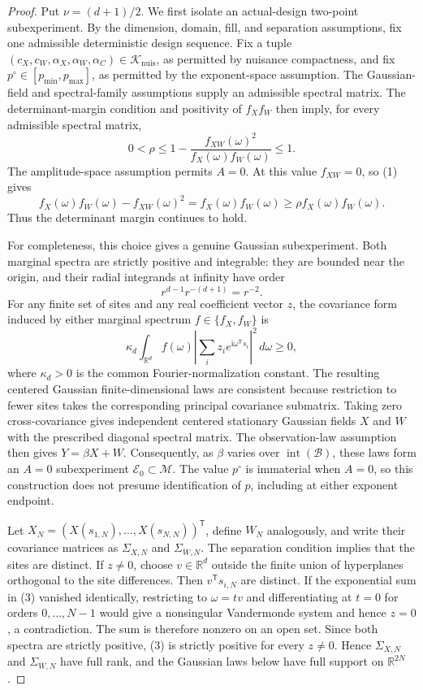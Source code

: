 \documentclass{article}
\begin{document}
\begin{proof}
Put \(\nu=(d+1)/2\).  We first isolate an actual-design two-point subexperiment.  By the dimension, domain, fill, and separation assumptions, fix one admissible deterministic design sequence.  Fix a tuple \((c_X,c_W,\alpha_X,\alpha_W,\alpha_C)\in\mathcal K_{\mathrm{nuis}}\), as permitted by nuisance compactness, and fix \(p^\circ\in[p_{\min},p_{\max}]\), as permitted by the exponent-space assumption.  The Gaussian-field and spectral-family assumptions supply an admissible spectral matrix.  The determinant-margin condition and positivity of \(f_Xf_W\) then imply, for every admissible spectral matrix,
\[
 0<\rho\leq 1-\frac{f_{XW}(\omega)^2}{f_X(\omega)f_W(\omega)}\leq1.
 \tag{1}
\]
The amplitude-space assumption permits \(A=0\).  At this value \(f_{XW}=0\), so (1) gives
\[
 f_X(\omega)f_W(\omega)-f_{XW}(\omega)^2
 =f_X(\omega)f_W(\omega)
 \geq\rho f_X(\omega)f_W(\omega).
 \tag{2}
\]
Thus the determinant margin continues to hold.

For completeness, this choice gives a genuine Gaussian subexperiment.  Both marginal spectra are strictly positive and integrable: they are bounded near the origin, and their radial integrands at infinity have order
\[
 r^{d-1}r^{-(d+1)}=r^{-2}.
\]
For any finite set of sites and any real coefficient vector \(z\), the covariance form induced by either marginal spectrum \(f\in\{f_X,f_W\}\) is
\[
 \kappa_d\int_{\mathbb R^d}f(\omega)
 \left|\sum_i z_i e^{\mathrm i\omega^{\mathsf T}s_i}\right|^2\,d\omega\geq0,
 \tag{3}
\]
where \(\kappa_d>0\) is the common Fourier-normalization constant.  The resulting centered Gaussian finite-dimensional laws are consistent because restriction to fewer sites takes the corresponding principal covariance submatrix.  Taking zero cross-covariance gives independent centered stationary Gaussian fields \(X\) and \(W\) with the prescribed diagonal spectral matrix.  The observation-law assumption then gives \(Y=\beta X+W\).  Consequently, as \(\beta\) varies over \(\operatorname{int}(\mathcal B)\), these laws form an \(A=0\) subexperiment \(\mathcal E_0\subset\mathcal M\).  The value \(p^\circ\) is immaterial when \(A=0\), so this construction does not presume identification of \(p\), including at either exponent endpoint.

Let \(X_N=(X(s_{1,N}),\ldots,X(s_{N,N}))^{\mathsf T}\), define \(W_N\) analogously, and write their covariance matrices as \(\Sigma_{X,N}\) and \(\Sigma_{W,N}\).  The separation condition implies that the sites are distinct.  If \(z\ne0\), choose \(v\in\mathbb R^d\) outside the finite union of hyperplanes orthogonal to the site differences.  Then \(v^{\mathsf T}s_{i,N}\) are distinct.  If the exponential sum in (3) vanished identically, restricting to \(\omega=tv\) and differentiating at \(t=0\) for orders \(0,\ldots,N-1\) would give a nonsingular Vandermonde system and hence \(z=0\), a contradiction.  The sum is therefore nonzero on an open set.  Since both spectra are strictly positive, (3) is strictly positive for every \(z\ne0\).  Hence \(\Sigma_{X,N}\) and \(\Sigma_{W,N}\) have full rank, and the Gaussian laws below have full support on \(\mathbb R^{2N}\).


\end{proof}
\end{document}
